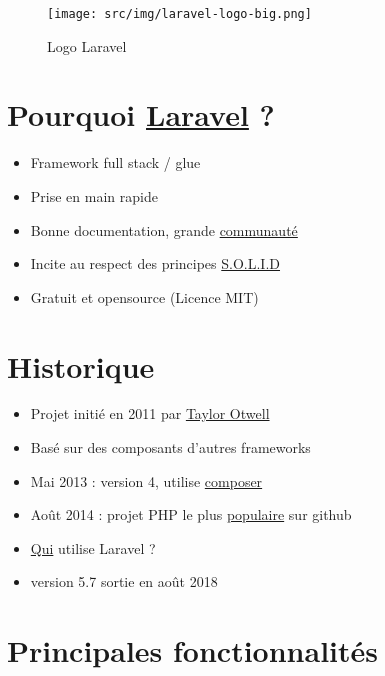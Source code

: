 \begin{figure}
\centering
\texttt{[image: src/img/laravel-logo-big.png]}
\caption{Logo Laravel}
\end{figure}

\hypertarget{pourquoi-laravel}{%
\section{\texorpdfstring{Pourquoi \href{https://laravel.com/}{Laravel}
?}{Pourquoi Laravel ?}}\label{pourquoi-laravel}}

\begin{itemize}
\tightlist
\item
  Framework full stack / glue
\item
  Prise en main rapide
\item
  Bonne documentation, grande \href{http://laravel.io/forum}{communauté}
\item
  Incite au respect des principes
  \href{http://fr.wikipedia.org/wiki/SOLID_(informatique)}{S.O.L.I.D}
\item
  Gratuit et opensource (Licence MIT)
\end{itemize}

\hypertarget{historique}{%
\section{Historique}\label{historique}}

\begin{itemize}
\tightlist
\item
  Projet initié en 2011 par \href{http://taylorotwell.com/}{Taylor
  Otwell}
\item
  Basé sur des composants d'autres frameworks
\item
  Mai 2013 : version 4, utilise
  \href{https://getcomposer.org/}{composer}
\item
  Août 2014 : projet PHP le plus
  \href{https://github.com/search?l=PHP\&q=stars\%3A\%3E0\&ref=searchresults\&type=Repositories}{populaire}
  sur github
\item
  \href{https://madewithlaravel.com/}{Qui} utilise Laravel ?
\item
  version 5.7 sortie en août 2018
\end{itemize}

\hypertarget{principales-fonctionnalituxe9s}{%
\section{Principales
fonctionnalités}\label{principales-fonctionnalituxe9s}}

